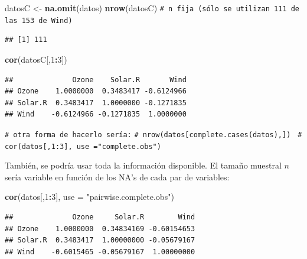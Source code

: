\documentclass[
]{book}
\newenvironment{Shaded}{\begin{snugshade}}{\end{snugshade}}
\newcommand{\AttributeTok}[1]{\textcolor[rgb]{0.13,0.29,0.53}{#1}}
\newcommand{\CommentTok}[1]{\textcolor[rgb]{0.56,0.35,0.01}{\textit{#1}}}
\newcommand{\DecValTok}[1]{\textcolor[rgb]{0.00,0.00,0.81}{#1}}
\newcommand{\FunctionTok}[1]{\textcolor[rgb]{0.13,0.29,0.53}{\textbf{#1}}}
\newcommand{\NormalTok}[1]{#1}
\newcommand{\OtherTok}[1]{\textcolor[rgb]{0.56,0.35,0.01}{#1}}
\newcommand{\SpecialCharTok}[1]{\textcolor[rgb]{0.81,0.36,0.00}{\textbf{#1}}}
\newcommand{\StringTok}[1]{\textcolor[rgb]{0.31,0.60,0.02}{#1}}
\theoremstyle{break}
\theoremstyle{nonumberplain}
\renewcommand{\CommentTok}[1]{\textcolor[rgb]{0.41,0.41,0.41}{\texttt{#1}}}
\begin{document}
\begin{Shaded}
\begin{Highlighting}[]
\NormalTok{datosC }\OtherTok{\textless{}{-}} \FunctionTok{na.omit}\NormalTok{(datos)}
\FunctionTok{nrow}\NormalTok{(datosC) }\CommentTok{\# n fija (sólo se utilizan 111 de las 153 de Wind)}
\end{Highlighting}
\end{Shaded}

\begin{verbatim}
## [1] 111
\end{verbatim}

\begin{Shaded}
\begin{Highlighting}[]
\FunctionTok{cor}\NormalTok{(datosC[,}\DecValTok{1}\SpecialCharTok{:}\DecValTok{3}\NormalTok{])}
\end{Highlighting}
\end{Shaded}

\begin{verbatim}
##              Ozone    Solar.R       Wind
## Ozone    1.0000000  0.3483417 -0.6124966
## Solar.R  0.3483417  1.0000000 -0.1271835
## Wind    -0.6124966 -0.1271835  1.0000000
\end{verbatim}

\begin{Shaded}
\begin{Highlighting}[]
\CommentTok{\# otra forma de hacerlo sería:}
\CommentTok{\# nrow(datos[complete.cases(datos),]) }
\CommentTok{\# cor(datos[,1:3], use ="complete.obs") }
\end{Highlighting}
\end{Shaded}

También, se podría usar toda la información disponible. El tamaño muestral \(n\) sería variable en función de los NA's de cada par de variables:

\begin{Shaded}
\begin{Highlighting}[]
\FunctionTok{cor}\NormalTok{(datos[,}\DecValTok{1}\SpecialCharTok{:}\DecValTok{3}\NormalTok{], }\AttributeTok{use =} \StringTok{"pairwise.complete.obs"}\NormalTok{)}
\end{Highlighting}
\end{Shaded}

\begin{verbatim}
##              Ozone     Solar.R        Wind
## Ozone    1.0000000  0.34834169 -0.60154653
## Solar.R  0.3483417  1.00000000 -0.05679167
## Wind    -0.6015465 -0.05679167  1.00000000
\end{verbatim}
\end{document}
